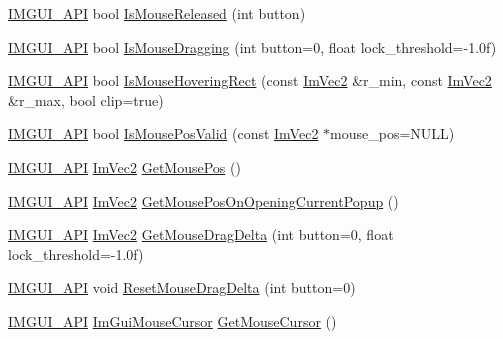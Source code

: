\begin{DoxyCompactItemize}
\item 
\mbox{\hyperlink{imgui_8h_a43829975e84e45d1149597467a14bbf5}{I\+M\+G\+U\+I\+\_\+\+A\+PI}} bool \mbox{\hyperlink{namespace_im_gui_aef586112e8d1eb26ce28198d9efe9bba}{Is\+Mouse\+Released}} (int button)
\item 
\mbox{\hyperlink{imgui_8h_a43829975e84e45d1149597467a14bbf5}{I\+M\+G\+U\+I\+\_\+\+A\+PI}} bool \mbox{\hyperlink{namespace_im_gui_a7905828a024c6c005fa1887e62235ca4}{Is\+Mouse\+Dragging}} (int button=0, float lock\+\_\+threshold=-\/1.\+0f)
\item 
\mbox{\hyperlink{imgui_8h_a43829975e84e45d1149597467a14bbf5}{I\+M\+G\+U\+I\+\_\+\+A\+PI}} bool \mbox{\hyperlink{namespace_im_gui_ae0b8ea0e06c457316d6aed6c5b2a1c25}{Is\+Mouse\+Hovering\+Rect}} (const \mbox{\hyperlink{struct_im_vec2}{Im\+Vec2}} \&r\+\_\+min, const \mbox{\hyperlink{struct_im_vec2}{Im\+Vec2}} \&r\+\_\+max, bool clip=true)
\item 
\mbox{\hyperlink{imgui_8h_a43829975e84e45d1149597467a14bbf5}{I\+M\+G\+U\+I\+\_\+\+A\+PI}} bool \mbox{\hyperlink{namespace_im_gui_a22d482190e8f549d5904aded1c6f7778}{Is\+Mouse\+Pos\+Valid}} (const \mbox{\hyperlink{struct_im_vec2}{Im\+Vec2}} $\ast$mouse\+\_\+pos=N\+U\+LL)
\item 
\mbox{\hyperlink{imgui_8h_a43829975e84e45d1149597467a14bbf5}{I\+M\+G\+U\+I\+\_\+\+A\+PI}} \mbox{\hyperlink{struct_im_vec2}{Im\+Vec2}} \mbox{\hyperlink{namespace_im_gui_abf11873349874c5d302861583c00d451}{Get\+Mouse\+Pos}} ()
\item 
\mbox{\hyperlink{imgui_8h_a43829975e84e45d1149597467a14bbf5}{I\+M\+G\+U\+I\+\_\+\+A\+PI}} \mbox{\hyperlink{struct_im_vec2}{Im\+Vec2}} \mbox{\hyperlink{namespace_im_gui_ac1ba5d7b76e11d47660b32dc851afd2f}{Get\+Mouse\+Pos\+On\+Opening\+Current\+Popup}} ()
\item 
\mbox{\hyperlink{imgui_8h_a43829975e84e45d1149597467a14bbf5}{I\+M\+G\+U\+I\+\_\+\+A\+PI}} \mbox{\hyperlink{struct_im_vec2}{Im\+Vec2}} \mbox{\hyperlink{namespace_im_gui_a94b8aecab8a4128145fea1ad7d381197}{Get\+Mouse\+Drag\+Delta}} (int button=0, float lock\+\_\+threshold=-\/1.\+0f)
\item 
\mbox{\hyperlink{imgui_8h_a43829975e84e45d1149597467a14bbf5}{I\+M\+G\+U\+I\+\_\+\+A\+PI}} void \mbox{\hyperlink{namespace_im_gui_aa03f31a184cafdf506feb2e8ba07f91e}{Reset\+Mouse\+Drag\+Delta}} (int button=0)
\item 
\mbox{\hyperlink{imgui_8h_a43829975e84e45d1149597467a14bbf5}{I\+M\+G\+U\+I\+\_\+\+A\+PI}} \mbox{\hyperlink{imgui_8h_a9223d6c82bb5d12c2eab5f829ca520ef}{Im\+Gui\+Mouse\+Cursor}} \mbox{\hyperlink{namespace_im_gui_a3b955bb840a2411f7c19ac6687d57392}{Get\+Mouse\+Cursor}} ()

\end{DoxyCompactItemize}
